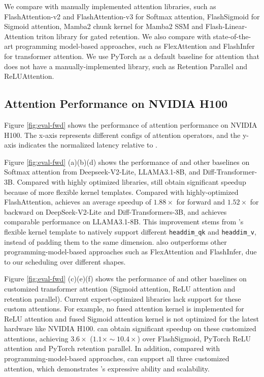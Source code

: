  We compare \oursys{} with manually implemented attention libraries, such as FlashAttention-v2\cite{dao2023flashattention} and FlashAttention-v3 \cite{shah2024flashattention} for Softmax attention, FlashSigmoid\cite{ramapuram2024sigmoidattn} for Sigmoid attention, Mamba2 chunk kernel\cite{dao2024mamba2} for Mamba2 SSM and Flash-Linear-Attention triton library\cite{yang2024fla} for gated retention. 
We also compare with state-of-the-art programming model-based approaches, such as FlexAttention\cite{dong2024flexattentionprogrammingmodel} and FlashInfer\cite{ye2025flashinferefficientcustomizableattention} for transformer attention. We use PyTorch\cite{pytorch} as a default baseline for attention that does not have a manually-implemented library, such as Retention Parallel\cite{sun2023retentive} and ReLUAttention\cite{wortsman2023replacingsoftmaxreluvision}.




\subsection{Attention Performance on NVIDIA H100}



Figure \ref{fig:eval-fwd} shows the performance of attention performance on NVIDIA H100. The x-axis represents different configs of attention operators, and the y-axis indicates the normalized latency relative to \oursys{}.

Figure \ref{fig:eval-fwd} (a)(b)(d) shows the performance of \oursys{} and other baselines on Softmax attention from Deepseek-V2-Lite, LLAMA3.1-8B, and Diff-Transformer-3B.
Compared with highly optimized libraries, \oursys{} still obtain significant speedup because of more flexible kernel templates. Compared with highly-optimized FlashAttention, \oursys{} achieves an average speedup of $1.88\times$ for forward and $1.52\times$ for backward on DeepSeek-V2-Lite and Diff-Transformers-3B, and achieves comparable performance on LLAMA3.1-8B. This improvement stems from \oursys{}'s flexible kernel template to natively support different \texttt{headdim\_qk} and \texttt{headdim\_v}, instead of padding them to the same dimension. \oursys{} also outperforms other programming-model-based approaches such as FlexAttention and FlashInfer, due to our scheduling over different shapes.

Figure \ref{fig:eval-fwd} (c)(e)(f) shows the performance of \oursys{} and other baselines on 
customized transformer attention (Sigmoid attention, ReLU attention and retention parallel). Current expert-optimized libraries lack support for these custom attentions. For example, no fused attention kernel is implemented for ReLU attention and fused Sigmoid attention kernel is not optimized for the latest hardware like NVIDIA H100. \oursys{} can obtain significant speedup on these customized attentions, achieving $3.6\times$ ($1.1\times\sim 10.4\times$) over FlashSigmoid, PyTorch ReLU attention and PyTorch retention parallel. In addition, compared with programming-model-based approaches, \oursys{} can support all three customized attention, which demonstrates \oursys{}'s expressive ability and scalability.


